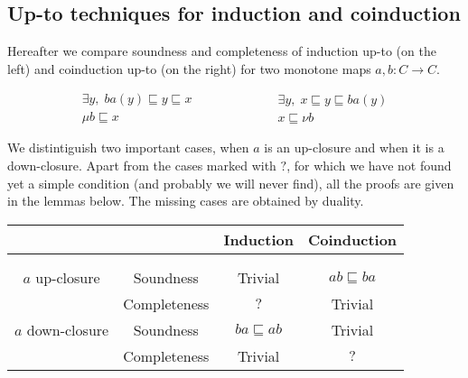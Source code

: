 \documentclass{llncs}
\begin{document}
\subsection{Up-to techniques for induction and coinduction}

Hereafter we compare soundness and completeness of induction up-to (on the left) and coinduction up-to (on the right) for two monotone maps $a,b\colon C\to C$.

 \begin{equation}\label{eq:comparisonincoin}
 \begin{array}{c}
    \exists y, \;  ba(y) \sqsubseteq y\sqsubseteq x \\
    \hline %
    \mu b \sqsubseteq x
\end{array}
\qquad \qquad \qquad
 \begin{array}{c}
    \exists y, \; x \sqsubseteq y\sqsubseteq ba(y)\\
    \hline %
    x \sqsubseteq \nu b
\end{array}
\end{equation}

We distintiguish two important cases, when $a$ is an up-closure and when it is a down-closure.  Apart from the cases marked with $?$, for which we have not found yet a simple condition (and probably we will never find), all the proofs are given in the lemmas below. The missing cases are obtained by duality.

\begin{center}
\begin{tabular}{cccc}
& & Induction & Coinduction \\
\hline \\
\hline \\
$a$ up-closure  & Soundness & Trivial & $ab\sqsubseteq ba$ \\
                          & Completeness & $?$ & Trivial \\
                     \hline
$a$ down-closure  & Soundness & $ba\sqsubseteq ab$ & Trivial \\
                          & Completeness & Trivial & $?$ \\                          
\end{tabular}
\end{center}
\end{document}

